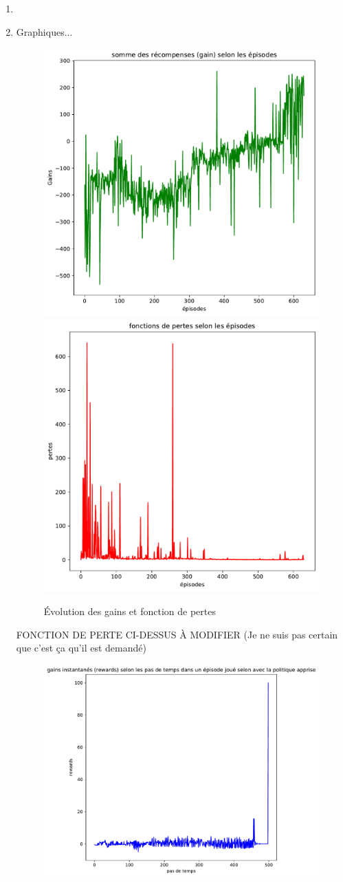 \documentclass[letterpaper,11pt]{article}
\begin{document}
\begin{enumerate}[label=(\alph*)]
\item {}\\


\item Graphiques...

\begin{center}
\begin{figure}[H]
\caption{Évolution des gains et fonction de pertes}
\includegraphics[width=0.45\linewidth]{gains.pdf} \hfill \includegraphics[width=0.45\linewidth]{pertes.pdf}
\end{figure}
\end{center}

FONCTION DE PERTE CI-DESSUS À MODIFIER (Je ne suis pas certain que c'est ça qu'il est demandé)


\begin{figure}[H]
\begin{center}
\caption{}
\includegraphics[scale=0.5]{gain_par_pas.pdf}
\end{center}
\end{figure}

\end{enumerate}
\end{document}
